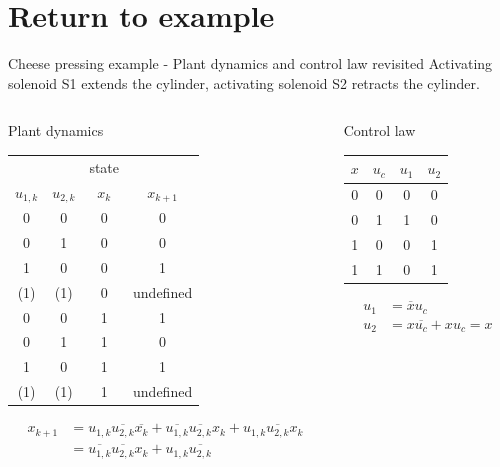 \documentclass[presentation,aspectratio=1610]{beamer}
\renewcommand*{\not}[1]{\ensuremath{\bar{#1}}}
\renewcommand*{\not}[1]{\ensuremath{\overline{#1}}}
\begin{document}
\section{Return to example}
\label{sec:orgc94041b}
\begin{frame}[label={sec:orge36e1ee}]{Cheese pressing example - Plant dynamics and control law revisited}
Activating solenoid S1 extends the cylinder, activating solenoid S2 retracts the cylinder.
\begin{columns}
\begin{column}{0.5\columnwidth}
\begin{block}{Plant dynamics}
\begin{center}
\begin{tabular}{|cc|cc|}
\hline
 &  & state & \\
\(u_{1,k}\) & \(u_{2,k}\) & \(x_k\) & \(x_{k+1}\)\\
\hline
0 & 0 & 0 & 0\\
0 & 1 & 0 & 0\\
1 & 0 & 0 & 1\\
(1) & (1) & 0 & undefined\\
0 & 0 & 1 & 1\\
0 & 1 & 1 & 0\\
1 & 0 & 1 & 1\\
(1) & (1) & 1 & undefined\\
\hline
\end{tabular}
\end{center}

\begin{align*} 
  x_{k+1} &= u_{1,k}\not{u_{2,k}}\not{x_k} + \not{u_{1,k}}\not{u_{2,k}}x_k + u_{1,k}\not{u_{2,k}}x_k\\ &=  \not{u_{1,k}}\not{u_{2,k}}x_k + u_{1,k}\not{u_{2,k}}
\end{align*}
\end{block}
\end{column}

\begin{column}{0.5\columnwidth}
\begin{block}{Control law}
\begin{center}
\begin{tabular}{|cc|cc|}
\hline
\(x\) & \(u_{c}\) & \(u_1\) & \(u_2\)\\
\hline
0 & 0 & 0 & 0\\
0 & 1 & 1 & 0\\
1 & 0 & 0 & 1\\
1 & 1 & 0 & 1\\
\hline
\end{tabular}
\end{center}

\begin{align*}
  u_1 &= \not{x}u_c\\
  u_2 &= x\not{u_c} + xu_c = x
\end{align*}
\end{block}
\end{column}
\end{columns}
\end{frame}
\end{document}
